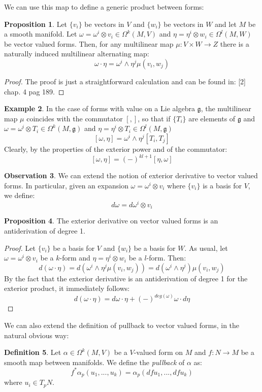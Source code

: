 \documentclass[12pt,a4paper]{report}
\theoremstyle{definition}
\newtheorem{Def}{Definition}[chapter]
\theoremstyle{Theorem}
\newtheorem{Prop}[Def]{Proposition}
\theoremstyle{definition}
\newtheorem{Ex}[Def]{Example}
\theoremstyle{definition}
\newtheorem{Obs}[Def]{Observation}
\begin{document}
	We can use this map to define a generic product between forms:
	\begin{Prop}
		Let $\{v_i\}$ be vectors in $V$ and $\{w_i\}$ be vectors in $W$ and let $M$ be a smooth manifold. Let $\omega=\omega^i\otimes v_i\in\Omega^k(M,V)$ and $\eta=\eta^i\otimes w_i\in\Omega^l(M,W)$ be vector valued forms. Then, for any multilinear map $\mu:V\times W\rightarrow Z$ there is a naturally induced multilinear alternating map:
		$$\omega\cdot \eta=\omega^i\wedge\eta^j \mu(v_i,w_j)$$
	\end{Prop}
	\begin{proof}
		The proof is just a straightforward calculation and can be found in: [2] chap. 4 pag 189.
	\end{proof}
	\begin{Ex}\label{Ex_3.5.1}
		In the case of forms with value on a Lie algebra $\mathfrak{g}$, the multilinear map $\mu$ coincides with the commutator $[,]$, so that if $\{T_i\}$ are elements of $\mathfrak{g}$ and $\omega=\omega^i\otimes T_i\in\Omega^k(M,\mathfrak{g})$ and $\eta=\eta^i\otimes T_i\in\Omega^l(M,\mathfrak{g})$
		$$[\omega,\eta]=\omega^i\wedge\eta^j[T_i,T_j]$$
		Clearly, by the properties of the exterior power and of the commutator:
		$$[\omega,\eta]=(-)^{kl+1}[\eta,\omega]$$
	\end{Ex}
	\begin{Obs}
		We can extend the notion of exterior derivative to vector valued forms. In particular, given an expansion $\omega=\omega^i\otimes v_i$ where $\{v_i\}$ is a basis for $V$, we define:
		$$d\omega=d\omega^i\otimes v_i$$
	\end{Obs}
	\begin{Prop}
		The exterior derivative on vector valued forms is an antiderivation of degree 1.
	\end{Prop}
	\begin{proof}
		Let $\{v_i\}$ be a basis for $V$ and $\{w_i\}$ be a basis for $W$. As usual, let $\omega=\omega^i\otimes v_i$ be a $k$-form and $\eta=\eta^i\otimes w_i$ be a $l$-form. Then:
		$$d(\omega\cdot \eta)=d(\omega^i\wedge\eta^j\mu(v_i,w_j))=d(\omega^i\wedge\eta^j)\mu(v_i,w_j)$$
		By the fact that the exterior derivative is an antiderivation of degree 1 for the exterior product, it immediately follows:
		$$d(\omega\cdot \eta)=d\omega\cdot \eta+(-)^{deg(\omega)}\omega\cdot d\eta$$
	\end{proof}
	We can also extend the definition of pullback to vector valued forms, in the natural obvious way:
	\begin{Def}
		Let $\alpha\in\Omega^k(M,V)$ be a $V$-valued form on $M$ and $f:N\rightarrow M$ be a smooth map between manifolds. We define the \textit{pullback} of $\alpha$ as:
		$$f^*\alpha_p(u_1,...,u_k)=\alpha_p(dfu_1,...,dfu_k)$$
		where $u_i\in T_pN$.
	\end{Def}
\end{document}
